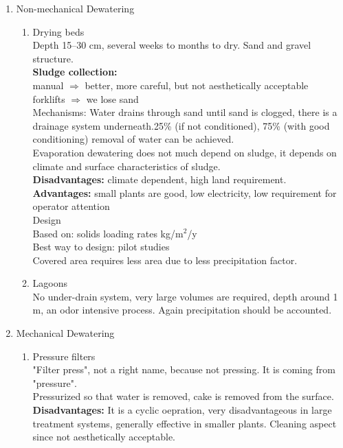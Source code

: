 \documentclass{article}
\numberwithin{equation}{section}
\begin{document}
\begin{enumerate}
    \item Non-mechanical Dewatering
    \begin{enumerate}
        \item Drying beds\\
        Depth 15--30 cm, several weeks to months to dry. Sand and gravel structure.\\
        \textbf{Sludge collection:}\\
        manual $\Rightarrow$ better, more careful, but not aesthetically acceptable\\
        forklifts $\Rightarrow$ we lose sand\\
        Mechanisms:
        Water drains through sand until sand is clogged, there is a drainage system underneath.25\% (if not conditioned), 75\% (with good conditioning) removal of water can be achieved.\\
        Evaporation dewatering does not much depend on sludge, it depends on climate and surface characteristics of sludge.\\
        \textbf{Disadvantages:} climate dependent, high land requirement.\\
        \textbf{Advantages:} small plants are good, low electricity, low requirement for operator attention\\
        Design\\
        Based on: solids loading rates kg/m$^2$/y\\
        Best way to design: pilot studies\\
        Covered area requires less area due to less precipitation factor.
        \item Lagoons\\
        No under-drain system, very large volumes are required, depth around 1 m, an odor intensive process. Again precipitation should be accounted.
    \end{enumerate}
    \item Mechanical Dewatering
    \begin{enumerate}
        \item Pressure filters\\
        "Filter press", not a right name, because not pressing. It is coming from "pressure".\\
        Pressurized so that water is removed, cake is removed from the surface.\\
        \textbf{Disadvantages:} It is a cyclic oepration, very disadvantageous in large treatment systems, generally effective in smaller plants. Cleaning aspect since not aesthetically acceptable.\\

\end{enumerate}
\end{enumerate}
\end{document}
